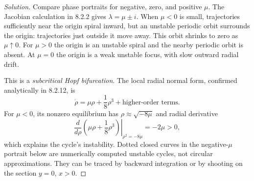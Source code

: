 \documentclass[10pt]{amsart}
\newenvironment{solution}
{\begin{proof}[Solution]}
{\end{proof}}
\begin{document}
\begin{onehalfspace}
        \begin{solution}

Compare phase portraits for negative, zero, and positive $\mu$. The Jacobian calculation in 8.2.2 gives $\lambda=\mu\pm i$. When $\mu<0$ is small, trajectories sufficiently near the origin spiral inward, but an unstable periodic orbit surrounds the origin: trajectories just outside it move away. This orbit shrinks to zero as $\mu\uparrow0$. For $\mu>0$ the origin is an unstable spiral and the nearby periodic orbit is absent. At $\mu=0$ the origin is a weak unstable focus, with slow outward radial drift.

This is a \emph{subcritical Hopf bifurcation}. The local radial normal form, confirmed analytically in 8.2.12, is
\[
 \dot\rho=\mu\rho+\frac18\rho^3+\text{higher-order terms}.
\]
For $\mu<0$, its nonzero equilibrium has $\rho\approx\sqrt{-8\mu}$ and radial derivative
\[
 \left.\frac{d}{d\rho}\left(\mu\rho+\frac18\rho^3\right)\right|_{\rho^2=-8\mu}
 =-2\mu>0,
\]
which explains the cycle's instability. Dotted closed curves in the negative-$\mu$ portrait below are numerically computed unstable cycles, not circular approximations. They can be traced by backward integration or by shooting on the section $y=0$, $x>0$.


\end{solution}
\end{onehalfspace}
\end{document}
